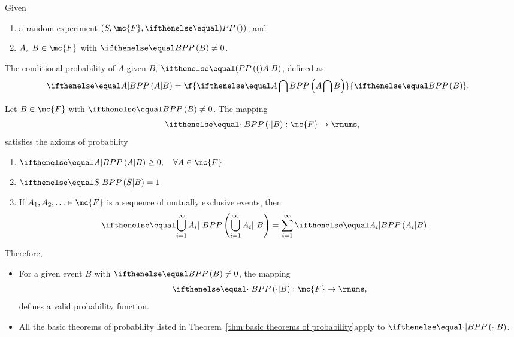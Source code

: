 Given 
\begin{enumerate}
    \item a random experiment $(S, \mc{F}, \prob )$, and
    \item $A, ~B\in\mc{F}$ with $\prob{B}\neq0$.
\end{enumerate}

\begin{mydefinition}
    The conditional probability of $A$ given $B$, $\prob(A|B)$, defined as 
    \begin{align}
        \prob{A|B} &= \f{\prob{A\bigcap B}}{\prob{B}}.
    \end{align}    
\end{mydefinition}
\begin{mytheorem}
  Let $B\in\mc{F}$ with $\prob{B}\neq 0$. The mapping 
  \begin{align}
    \prob{\cdot|B}:\mc{F}\to\rnums,
  \end{align}  
  satisfies the axioms of probability
  \begin{enumerate}
      \item $\prob{A|B}\geq 0,\quad \forall A\in\mc{F}$
      \item $\prob{S|B}=1$
      \item If $A_{1}, A_{2},\ldots\in\mc{F}$ is a sequence of mutually exclusive events, then
      \begin{align}
        \prob{\bigcup_{i=1}^{\infty}A_{i}|~B} &= \sum_{i=1}^{\infty}\prob{A_{i}|B}.
      \end{align}
  \end{enumerate}
\end{mytheorem}
Therefore,
\begin{itemize}
    \item For a given event $B$ with $\prob{B}\neq 0$, the mapping
    \begin{align}
        \prob{\cdot | B} : \mc{F}\to\rnums,
    \end{align}
    defines a valid probability function.
    \item All the basic theorems of probability listed in Theorem~\ref{thm:basic theorems of probability}apply to $\prob{\cdot|B}$.
\end{itemize}
